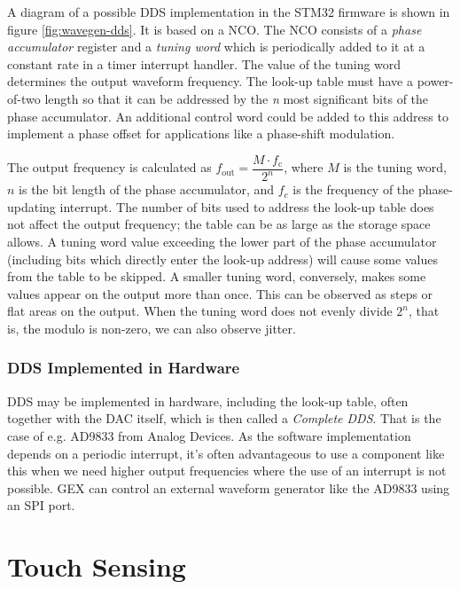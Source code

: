 A diagram of a possible \gls{DDS} implementation in the STM32 firmware is shown in figure \ref{fig:wavegen-dds}. It is based on a \gls{NCO}. The \gls{NCO} consists of a \textit{phase accumulator} register and a \textit{tuning word} which is periodically added to it at a constant rate in a timer interrupt handler. The value of the tuning word determines the output waveform frequency. The look-up table must have a power-of-two length so that it can be addressed by the \textit{n} most significant bits of the phase accumulator. An additional control word could be added to this address to implement a phase offset for applications like a phase-shift modulation.

The output frequency is calculated as \(f_\mathrm{out} = \dfrac{M\cdot f_\mathrm{c}}{2^n}\), where $M$ is the tuning word, $n$ is the bit length of the phase accumulator, and $f_c$ is the frequency of the phase-updating interrupt. The number of bits used to address the look-up table does not affect the output frequency; the table can be as large as the storage space allows. A tuning word value exceeding the lower part of the phase accumulator (including bits which directly enter the look-up address) will cause some values from the table to be skipped. A smaller tuning word, conversely, makes some values appear on the output more than once. This can be observed as steps or flat areas on the output. When the tuning word does not evenly divide $2^n$, that is, the modulo is non-zero, we can also observe jitter.

\subsubsection{DDS Implemented in Hardware}

DDS may be implemented in hardware, including the look-up table, often together with the \gls{DAC} itself, which is then called a \textit{Complete \gls{DDS}}. That is the case of e.g. AD9833 from Analog Devices. As the software implementation depends on a periodic interrupt, it's often advantageous to use a component like this when we need higher output frequencies where the use of an interrupt is not possible. GEX can control an external waveform generator like the AD9833 using an \gls{SPI} port.

\section{Touch Sensing} \label{sec:theory-touch}

